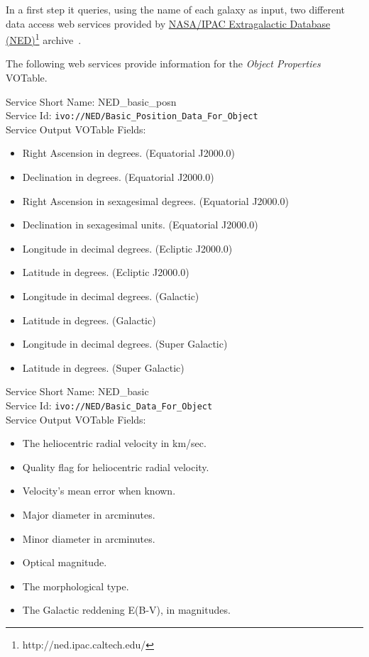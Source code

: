 \documentclass{aa}
\begin{document}
In a first step it queries, using the name of each galaxy as input, two different data access web services provided by \href{http://ned.ipac.caltech.edu/}{NASA/IPAC Extragalactic Database (NED)}\footnote{http://ned.ipac.caltech.edu/} archive~\citep{Mazzarella2008}.

The following web services provide information for the \textit{Object Properties} VOTable.

\begin{minipage}[h]{0.99\columnwidth}
  \small \vspace{\baselineskip}
  \noindent Service Short Name: NED\_basic\_posn\\
  Service Id: \texttt{ivo://NED/Basic\_Position\_Data\_For\_Object}\\
  Service Output VOTable Fields:
  \begin{itemize}
	  \item Right Ascension in degrees. (Equatorial J2000.0)
	  \item Declination in degrees. (Equatorial J2000.0)
	  \item Right Ascension in sexagesimal degrees. (Equatorial J2000.0)
	  \item Declination in sexagesimal units. (Equatorial J2000.0)
	  \item Longitude in decimal degrees. (Ecliptic J2000.0)
	  \item Latitude in degrees. (Ecliptic J2000.0)
	  \item Longitude in decimal degrees. (Galactic)
	  \item Latitude in degrees. (Galactic)
	  \item Longitude in decimal degrees. (Super Galactic)
	  \item Latitude in degrees. (Super Galactic)
  \end{itemize}
\end{minipage}

\begin{minipage}[h]{0.99\columnwidth}
  \small \vspace{\baselineskip}
  \noindent Service Short Name: NED\_basic\\
Service Id: \texttt{ivo://NED/Basic\_Data\_For\_Object}\\
Service Output VOTable Fields:
\begin{itemize}
\item The heliocentric radial velocity in km/sec.
\item Quality flag for heliocentric radial velocity.
\item Velocity's mean error when known.
\item Major diameter in arcminutes.
\item Minor diameter in arcminutes.
\item Optical magnitude.
\item The morphological type.
\item The Galactic reddening E(B-V), in magnitudes.
\end{itemize}
\vspace{\baselineskip}
\end{minipage}
\end{document}
